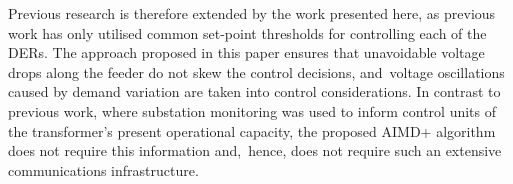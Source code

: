 Previous research is therefore extended by the work presented here, as previous work has only utilised common set-point thresholds for controlling each of the DERs. The approach proposed in this paper ensures that unavoidable voltage drops along the feeder do not skew the control decisions, and~voltage oscillations caused by demand variation are taken into control considerations. In contrast to previous work, where substation monitoring was used to inform control units of the transformer's present operational capacity, the proposed AIMD+ algorithm does not require this information and,~hence, does not require such an extensive communications infrastructure.